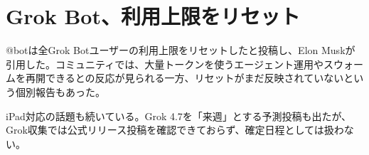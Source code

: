\section{Grok Bot、利用上限をリセット}
@botは全Grok Botユーザーの利用上限をリセットしたと投稿し、Elon Muskが引用した。コミュニティでは、大量トークンを使うエージェント運用やスウォームを再開できるとの反応が見られる一方、リセットがまだ反映されていないという個別報告もあった。

iPad対応の話題も続いている。Grok 4.7を「来週」とする予測投稿も出たが、Grok収集では公式リリース投稿を確認できておらず、確定日程としては扱わない。
